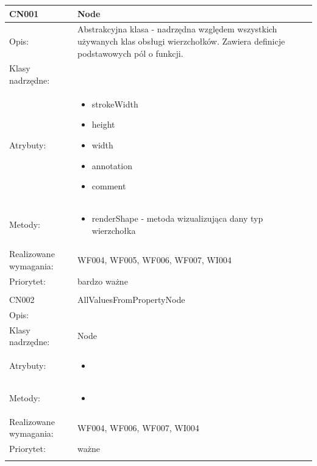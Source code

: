 \documentclass[a4paper,10pt]{article}
\begin{document}
\begin{center}
 


\begin{longtable}{|m{3cm}|m{9cm}|} \hline

CN001 & Node \\ \hline
Opis: & Abstrakcyjna klasa - nadrzędna względem wszystkich używanych klas obsługi wierzchołków. Zawiera definicje podstawowych pól o funkcji.    \\ \hline
Klasy nadrzędne: &     \\ \hline
Atrybuty: & \begin{itemize}
 \item strokeWidth
 \item height
 \item width
 \item annotation
 \item comment 
\end{itemize}
 \\ \hline
Metody: & \begin{itemize}
 \item renderShape - metoda wizualizująca dany typ wierzchołka
\end{itemize}
  \\ \hline
Realizowane wymagania: & WF004, WF005, WF006, WF007, WI004 \\ \hline
Priorytet: & bardzo ważne  \\ \hline

\multicolumn{2}{c}{} \\
 \hline

CN002 & AllValuesFromPropertyNode \\ \hline
Opis: &     \\ \hline
Klasy nadrzędne: & Node     \\ \hline
Atrybuty: & \begin{itemize}
 \item 
\end{itemize}
 \\ \hline
Metody: & \begin{itemize}
 \item 
\end{itemize}
  \\ \hline
Realizowane wymagania: & WF004, WF006, WF007, WI004 \\ \hline
Priorytet: & ważne \\ \hline

\multicolumn{2}{c}{} \\
 \hline


\end{longtable}
\end{center}
\end{document}

